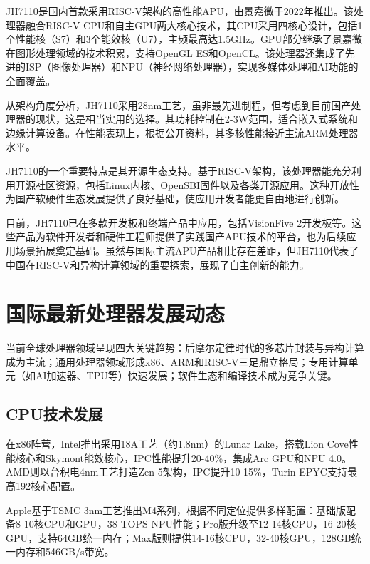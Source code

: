 \documentclass[a4paper,colorlinks=true,linkcolor=blue,urlcolor=blue,citecolor=green,bookmarks=true]{article}
\begin{document}
JH7110是国内首款采用RISC-V架构的高性能APU，由景嘉微于2022年推出。该处理器融合RISC-V CPU和自主GPU两大核心技术，其CPU采用四核心设计，包括1个性能核（S7）和3个能效核（U7），主频最高达1.5GHz。GPU部分继承了景嘉微在图形处理领域的技术积累，支持OpenGL ES和OpenCL。该处理器还集成了先进的ISP（图像处理器）和NPU（神经网络处理器），实现多媒体处理和AI功能的全面覆盖\cite{10}\cite{12}\cite{13}。

从架构角度分析，JH7110采用28nm工艺，虽非最先进制程，但考虑到目前国产处理器的现状，这是相当实用的选择。其功耗控制在2-3W范围，适合嵌入式系统和边缘计算设备。在性能表现上，根据公开资料，其多核性能接近主流ARM处理器水平\cite{10}\cite{12}\cite{13}。

JH7110的一个重要特点是其开源生态支持。基于RISC-V架构，该处理器能充分利用开源社区资源，包括Linux内核、OpenSBI固件以及各类开源应用。这种开放性为国产软硬件生态发展提供了良好基础，使应用开发者能更自由地进行创新\cite{10}\cite{12}\cite{13}。

目前，JH7110已在多款开发板和终端产品中应用，包括VisionFive 2开发板等。这些产品为软件开发者和硬件工程师提供了实践国产APU技术的平台，也为后续应用场景拓展奠定基础。虽然与国际主流APU产品相比存在差距，但JH7110代表了中国在RISC-V和异构计算领域的重要探索，展现了自主创新的能力\cite{10}\cite{12}\cite{13}。

\section{国际最新处理器发展动态}

当前全球处理器领域呈现四大关键趋势：后摩尔定律时代的多芯片封装与异构计算成为主流；通用处理器领域形成x86、ARM和RISC-V三足鼎立格局；专用计算单元（如AI加速器、TPU等）快速发展；软件生态和编译技术成为竞争关键\cite{14}\cite{15}。

\subsection{CPU技术发展}

在x86阵营，Intel推出采用18A工艺（约1.8nm）的Lunar Lake，搭载Lion Cove性能核心和Skymont能效核心，IPC性能提升20-40\%，集成Arc GPU和NPU 4.0\cite{14}。AMD则以台积电4nm工艺打造Zen 5架构，IPC提升10-15\%，Turin EPYC支持最高192核心配置\cite{14}\cite{15}。

Apple基于TSMC 3nm工艺\cite{15}推出M4系列，根据不同定位提供多样配置：基础版配备8-10核CPU和GPU，38 TOPS NPU性能；Pro版升级至12-14核CPU，16-20核GPU，支持64GB统一内存；Max版则提供14-16核CPU，32-40核GPU，128GB统一内存和546GB/s带宽。
\end{document}

